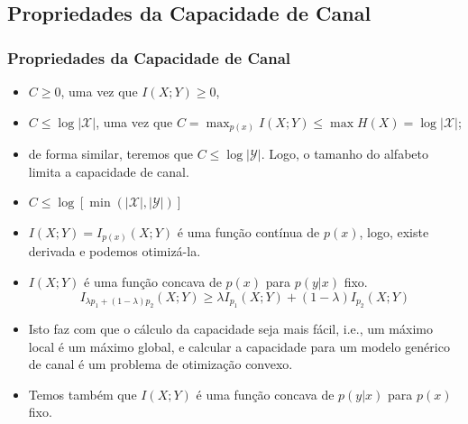 \subsection{Propriedades da Capacidade de Canal}
\begin{frame}[allowframebreaks]
  \frametitle{Propriedades da Capacidade de Canal}

  \begin{itemize}
  \item $C \geq 0$, uma vez que $I(X;Y) \geq 0$,
  \item $C \leq \log \vert \mathcal{X} \vert$, uma vez que $C = \max_{p(x)} I(X;Y) \leq \max H(X) = \log \vert \mathcal{X} \vert$;
  \item de forma similar, teremos que $C \leq \log \vert \mathcal{Y} \vert$. Logo, o tamanho do alfabeto limita a capacidade de canal.
  \item $C \leq \log \left[ \min \left( \vert \mathcal{X} \vert , \vert \mathcal{Y} \vert \right) \right]$
  \item $I(X;Y) = I_{p(x)} (X;Y)$ é uma função contínua de $p(x)$, logo, existe derivada e podemos otimizá-la.
  \item $I(X;Y)$ é uma função concava de $p(x)$ para $p(y|x)$ fixo. 
	\begin{equation}
	I_{\lambda p_1 + (1-\lambda) p_2}(X;Y) \geq \lambda I_{p_1}(X;Y) + (1-\lambda) I_{p_2}(X;Y)
	\end{equation}
  \item Isto faz com que o cálculo da capacidade seja mais fácil, i.e., um máximo local é
	um máximo global, e calcular a capacidade para um modelo genérico de canal é um problema de
	otimização convexo.
  \item Temos também que $I(X;Y)$ é uma função concava de $p(y|x)$ para $p(x)$ fixo.
  \end{itemize}

\end{frame}



